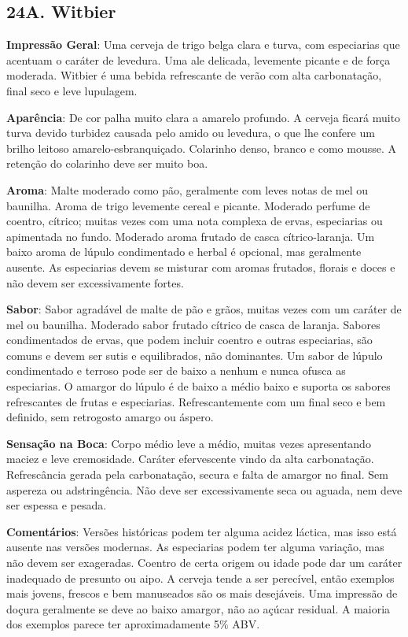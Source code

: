 \subsection*{24A. Witbier}

\textbf{Impressão Geral}: Uma cerveja de trigo belga clara e turva, com especiarias que acentuam o caráter de levedura. Uma ale delicada, levemente picante e de força moderada. Witbier é uma bebida refrescante de verão com alta carbonatação, final seco e leve lupulagem.

\textbf{Aparência}: De cor palha muito clara a amarelo profundo. A cerveja ficará muito turva devido turbidez causada pelo amido ou levedura, o que lhe confere um brilho leitoso amarelo-esbranquiçado. Colarinho denso, branco e como mousse. A retenção do colarinho deve ser muito boa.

\textbf{Aroma}: Malte moderado como pão, geralmente com leves notas de mel ou baunilha. Aroma de trigo levemente cereal e picante. Moderado perfume de coentro, cítrico; muitas vezes com uma nota complexa de ervas, especiarias ou apimentada no fundo. Moderado aroma frutado de casca cítrico-laranja. Um baixo aroma de lúpulo condimentado e herbal é opcional, mas geralmente ausente. As especiarias devem se misturar com aromas frutados, florais e doces e não devem ser excessivamente fortes.

\textbf{Sabor}: Sabor agradável de malte de pão e grãos, muitas vezes com um caráter de mel ou baunilha. Moderado sabor frutado cítrico de casca de laranja. Sabores condimentados de ervas, que podem incluir coentro e outras especiarias, são comuns e devem ser sutis e equilibrados, não dominantes. Um sabor de lúpulo condimentado e terroso pode ser de baixo a nenhum e nunca ofusca as especiarias. O amargor do lúpulo é de baixo a médio baixo e suporta os sabores refrescantes de frutas e especiarias. Refrescantemente com um final seco e bem definido, sem retrogosto amargo ou áspero.

\textbf{Sensação na Boca}: Corpo médio leve a médio, muitas vezes apresentando maciez e leve cremosidade. Caráter efervescente vindo da alta carbonatação. Refrescância gerada pela carbonatação, secura e falta de amargor no final. Sem aspereza ou adstringência. Não deve ser excessivamente seca ou aguada, nem deve ser espessa e pesada.

\textbf{Comentários}: Versões históricas podem ter alguma acidez láctica, mas isso está ausente nas versões modernas. As especiarias podem ter alguma variação, mas não devem ser exageradas. Coentro de certa origem ou idade pode dar um caráter inadequado de presunto ou aipo. A cerveja tende a ser perecível, então exemplos mais jovens, frescos e bem manuseados são os mais desejáveis. Uma impressão de doçura geralmente se deve ao baixo amargor, não ao açúcar residual. A maioria dos exemplos parece ter aproximadamente 5\% ABV.

